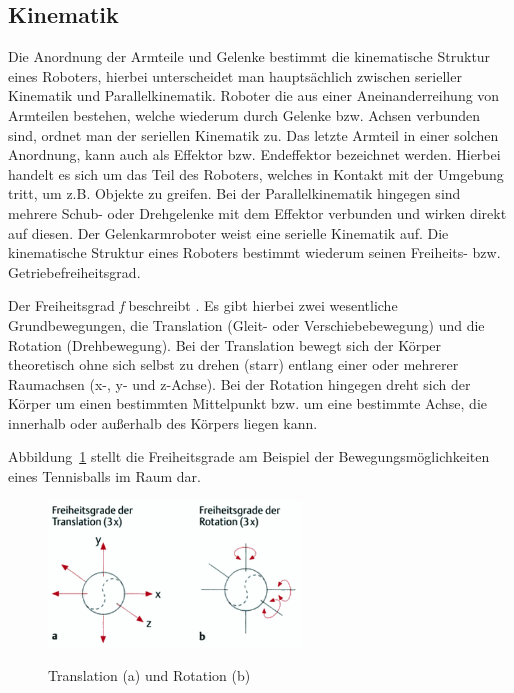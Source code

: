 \documentclass[11pt,ngerman,parskip=half]{scrartcl}
\begin{document}
\subsection{Kinematik}
\label{subsec:john_kinematik}
Die Anordnung der Armteile und Gelenke bestimmt die kinematische Struktur
eines Roboters, hierbei unterscheidet man hauptsächlich zwischen serieller
Kinematik und Parallelkinematik. Roboter die aus einer Aneinanderreihung von
Armteilen bestehen, welche wiederum durch Gelenke bzw. Achsen verbunden sind,
ordnet man der seriellen Kinematik zu. Das letzte Armteil in einer solchen
Anordnung, kann auch als Effektor bzw. Endeffektor bezeichnet werden. Hierbei
handelt es sich um das Teil des Roboters, welches in Kontakt mit der Umgebung
tritt, um z.B. Objekte zu greifen. Bei der Parallelkinematik hingegen sind
mehrere Schub- oder Drehgelenke mit dem Effektor verbunden und wirken direkt
auf diesen. Der Gelenkarmroboter weist eine serielle Kinematik auf. Die
kinematische Struktur eines Roboters bestimmt wiederum seinen Freiheits- bzw.
Getriebefreiheitsgrad. \parencite[vgl.][17--20]{weber_industrieroboter:_2017}

Der Freiheitsgrad \textit{f} beschreibt
. Es gibt hierbei zwei wesentliche
Grundbewegungen, die Translation (Gleit- oder Verschiebebewegung) und die
Rotation (Drehbewegung). Bei der Translation bewegt sich der Körper
theoretisch ohne sich selbst zu drehen (starr) entlang einer oder mehrerer
Raumachsen (x-, y- und z-Achse). Bei der Rotation hingegen dreht sich der
Körper um einen bestimmten Mittelpunkt bzw. um eine bestimmte Achse, die
innerhalb oder außerhalb des Körpers liegen kann.
\parencite[vgl.][53\psq]{schunke_funktionelle_2014}

Abbildung~\ref{img:john3} stellt die Freiheitsgrade am
Beispiel der Bewegungsmöglichkeiten eines Tennisballs im Raum dar.
\begin{figure}[H]
  \centering
  \includegraphics[width=0.6\textwidth]{src/img/john3.png}
  \caption{Translation (a) und Rotation (b)}
  \label{img:john3}
  \parencite[][53]{schunke_funktionelle_2014}
\end{figure}
\end{document}
